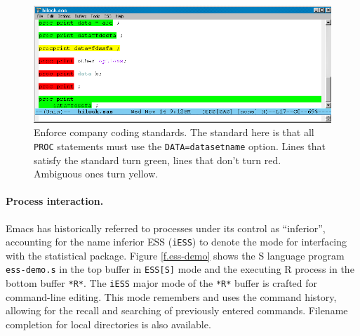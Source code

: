 \documentclass{article}
\newif\ifdraft
\newcommand{\stexttt}[1]{{\small\texttt{#1}}}
\newcommand{\emptyfig}{
\hspace*{42pt}\rule{324pt}{.25pt}\\
\hspace*{42pt}\rule{.25pt}{10pc}
\rule{316pt}{.25pt}
\rule{.25pt}{10pc}}
\begin{document}

\begin{figure}[tbp]
  \centering
  \ifdraft
     \emptyfig
  \else
     \includegraphics[angle=270,width=\textwidth]{hilock-sas}
  \fi
  \caption{Enforce company coding standards.  The standard here is
    that all \stexttt{PROC} statements must use the
    \stexttt{DATA=datasetname} option.  Lines that satisfy the
    standard turn green, lines that don't turn red.
    Ambiguous ones turn yellow.}
  \label{f.hilock}
\end{figure}

\paragraph{Process interaction.}
Emacs has historically referred to processes under its control as
``inferior'', accounting for the name inferior ESS (\stexttt{iESS}) to
denote the mode for interfacing with the statistical package.  Figure
\ref{f.ess-demo} shows the S language program \stexttt{ess-demo.s} in
the top buffer in \stexttt{ESS[S]} mode and the executing R process in
the bottom buffer \stexttt{*R*}.  The
\stexttt{iESS} major mode of the \stexttt{*R*} buffer is crafted for
command-line editing.  This mode remembers and uses the command
history, allowing for the recall and searching of previously entered
commands.  Filename completion for local directories is also
available.
\end{document}
